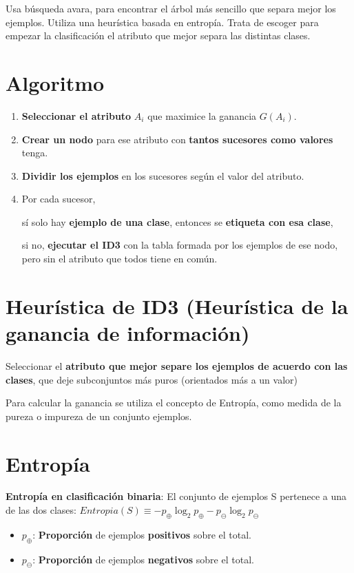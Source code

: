 \documentclass[12pt, twoside, openright]{report} %
\begin{document}
Usa búsqueda avara, para encontrar el árbol más sencillo que separa mejor los ejemplos. Utiliza una heurística basada en entropía. Trata de escoger para empezar la clasificación el atributo que mejor separa las distintas clases.

\section{Algoritmo}

\begin{enumerate}
	\def\labelenumi{\arabic{enumi}.}
	\item \textbf{Seleccionar el atributo} \(A_i\) que maximice la ganancia
	      \(G(A_i)\).
	\item \textbf{Crear un nodo} para ese atributo con \textbf{tantos sucesores como valores} tenga.
	\item \textbf{Dividir los ejemplos} en los sucesores según el valor del atributo.
	\item Por cada sucesor,

	      sí solo hay \textbf{ejemplo de una clase}, entonces se \textbf{etiqueta con esa clase},

	      si no, \textbf{ejecutar el ID3} con la tabla formada por los ejemplos de ese nodo, pero sin el atributo que todos tiene en común.
\end{enumerate}

\section{Heurística de ID3 (Heurística de la ganancia de
  información)}

Seleccionar el \textbf{atributo que mejor separe los ejemplos de acuerdo
	con las clases}, que deje subconjuntos más puros (orientados más a un
valor)

Para calcular la ganancia se utiliza el concepto de Entropía, como medida de la pureza o impureza de un conjunto ejemplos.
\pagebreak
\section{Entropía}

\textbf{Entropía en clasificación binaria}: El conjunto de ejemplos S
pertenece a una de las dos clases:
\textbf{\(Entropia(S) \equiv -p_\oplus \log _2 p_\oplus -p_\ominus \log _2 p_\ominus\)}

\begin{itemize}
	\item \(p_\oplus\): \textbf{Proporción} de ejemplos \textbf{positivos} sobre el total.
	\item \(p_\ominus\): \textbf{Proporción} de ejemplos \textbf{negativos} sobre el total.
\end{itemize}
\end{document}
